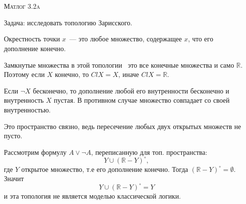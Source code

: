 \documentclass[10pt]{article}
\begin{document}
\def\chap#1#2{\ \\ {\large\bf#1 \ | \ \tt\scshape#2} \par}

\ \vspace{-1cm}

{\bf
\ \\
\Large\centerline{\scshape Матлог 3.2a}
}\normalsize

Задача: исследовать топологию Зарисского.

Окрестность точки $x$~--- это любое множество, содержащее $x$, что его дополнение конечно.

Замкнутые множества в этой топологии~ это все конечные множества и само $\mathbb{R}$.
Поэтому  если $X$ конечно, то $Cl X = X$, иначе $Cl X = \mathbb{R}$.

Если $\neg X$ бесконечно, то дополнение любой его внутренности бесконечно и внутренность $X$ пустая.
В противном случае множество совпадает со своей внутренностью.

Это пространство связно, ведь пересечение любых двух открытых множеств не пусто.

Рассмотрим формулу $A \lor \neg A$, переписанную для топ. пространства: 
\[ Y \cup (\mathbb{R} - Y)^\circ,\]
где $Y$ открытое множество, т.е его дополнение конечно. 
Тогда $(\mathbb{R}- Y)^\circ = \emptyset$.
Значит \[ Y \cup (\mathbb{R} -Y)^\circ = Y\]
и эта топология не является моделью классической логики.
\end{document}
